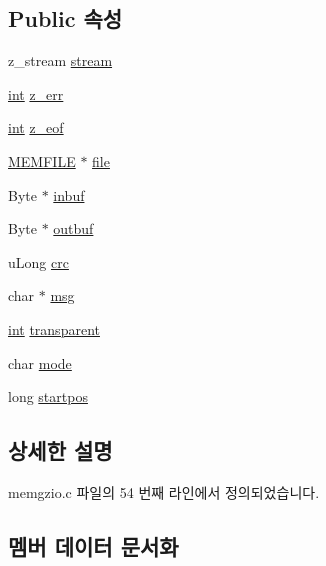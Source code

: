 \subsection*{Public 속성}
\begin{DoxyCompactItemize}
\item 
z\+\_\+stream \mbox{\hyperlink{structmem__stream_a8e95715455ffbde3f8bf840180eabd37}{stream}}
\item 
\mbox{\hyperlink{_util_8cpp_a0ef32aa8672df19503a49fab2d0c8071}{int}} \mbox{\hyperlink{structmem__stream_a0049d60995cda5d1638ebce2a4eb3155}{z\+\_\+err}}
\item 
\mbox{\hyperlink{_util_8cpp_a0ef32aa8672df19503a49fab2d0c8071}{int}} \mbox{\hyperlink{structmem__stream_ac41bfcdbcada66bebb9709e8638f6b80}{z\+\_\+eof}}
\item 
\mbox{\hyperlink{memgzio_8c_aebbc1e519147882ded18ad14979fe817}{M\+E\+M\+F\+I\+LE}} $\ast$ \mbox{\hyperlink{structmem__stream_a3bba5271c2ba53db444ce0b70d1c6fe1}{file}}
\item 
Byte $\ast$ \mbox{\hyperlink{structmem__stream_ad151b26e8ac236612276193c515b6e67}{inbuf}}
\item 
Byte $\ast$ \mbox{\hyperlink{structmem__stream_a3c4eae5484fee4862306c274407f3d13}{outbuf}}
\item 
u\+Long \mbox{\hyperlink{structmem__stream_a51276ceb0be94f2201a059c8697dc853}{crc}}
\item 
char $\ast$ \mbox{\hyperlink{structmem__stream_a8b64f897dff31431aaf6608e32996e26}{msg}}
\item 
\mbox{\hyperlink{_util_8cpp_a0ef32aa8672df19503a49fab2d0c8071}{int}} \mbox{\hyperlink{structmem__stream_ad970d09fe4cbcc6595b2d08b39d50db1}{transparent}}
\item 
char \mbox{\hyperlink{structmem__stream_a30a6ad1cea6962847c45dd540d702f6f}{mode}}
\item 
long \mbox{\hyperlink{structmem__stream_a50cada517a32582e93025846359ddec7}{startpos}}
\end{DoxyCompactItemize}


\subsection{상세한 설명}


memgzio.\+c 파일의 54 번째 라인에서 정의되었습니다.



\subsection{멤버 데이터 문서화}
\mbox{\label{structmem__stream_a51276ceb0be94f2201a059c8697dc853}} 
